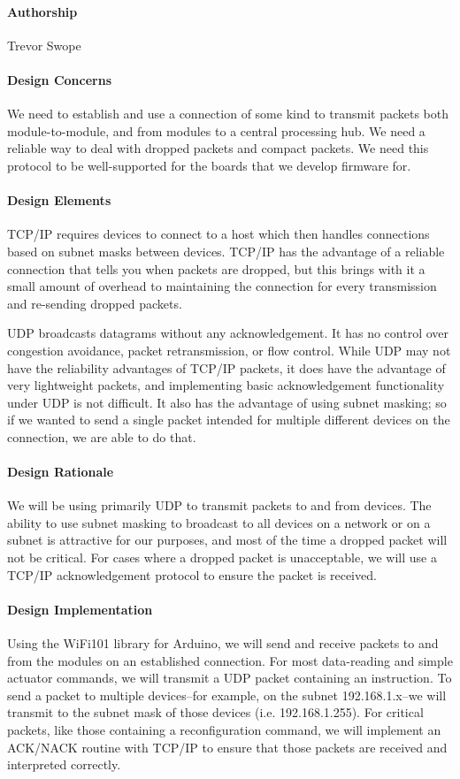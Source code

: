\documentclass[onecolumn, draftclsnofoot,10pt, compsoc]{IEEEtran}
\begin{document}
\paragraph{Authorship}
    Trevor Swope

\paragraph{Design Concerns}
    We need to establish and use a connection of some kind to transmit packets both module-to-module, and from modules to a central processing hub. We need a reliable way to deal with dropped packets and compact packets. We need this protocol to be well-supported for the boards that we develop firmware for.

\paragraph{Design Elements}
    TCP/IP \cite{TCP} requires devices to connect to a host which then handles connections based on subnet masks between devices. TCP/IP has the advantage of a reliable connection that tells you when packets are dropped, but this brings with it a small amount of overhead to maintaining the connection for every transmission and re-sending dropped packets.

    UDP \cite{UDP} broadcasts datagrams without any acknowledgement. It has no control over congestion avoidance, packet retransmission, or flow control. While UDP may not have the reliability advantages of TCP/IP packets, it does have the advantage of very lightweight packets, and implementing basic acknowledgement functionality under UDP is not difficult. It also has the advantage of using subnet masking; so if we wanted to send a single packet intended for multiple different devices on the connection, we are able to do that.

\paragraph{Design Rationale}
    We will be using primarily UDP to transmit packets to and from devices. The ability to use subnet masking to broadcast to all devices on a network or on a subnet is attractive for our purposes, and most of the time a dropped packet will not be critical. For cases where a dropped packet is unacceptable, we will use a TCP/IP acknowledgement protocol to ensure the packet is received.

\paragraph{Design Implementation}
    Using the WiFi101 library for Arduino, we will send and receive packets to and from the modules on an established connection. For most data-reading and simple actuator commands, we will transmit a UDP packet containing an instruction. To send a packet to multiple devices--for example, on the subnet 192.168.1.x--we will transmit to the subnet mask of those devices (i.e. 192.168.1.255). For critical packets, like those containing a reconfiguration command, we will implement an ACK/NACK routine with TCP/IP to ensure that those packets are received and interpreted correctly.
\end{document}
